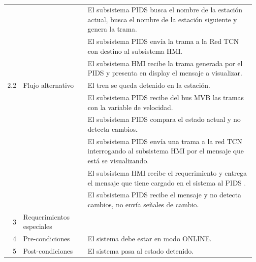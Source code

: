 \begin{table}[]
\begin{tabular}{|lll|}
\multicolumn{1}{|l|}{{ }} & \multicolumn{1}{l|}{{ }} & { El subsistema PIDS busca el nombre de la estación actual, busca el nombre de la estación siguiente y genera la trama.} \\
 
\multicolumn{1}{|l|}{{ }} & \multicolumn{1}{l|}{{ }} & { El subsistema PIDS envía la trama a la Red TCN con destino al subsistema HMI.} \\
 
\multicolumn{1}{|l|}{{ }} & \multicolumn{1}{l|}{{ }} & { El subsistema HMI recibe la trama generada por el PIDS y presenta en display el mensaje a visualizar.} \\
 
\multicolumn{1}{|r|}{{ 2.2}} & \multicolumn{1}{l|}{{ Flujo alternativo}} & { El tren se queda detenido en la estación.} \\
 
\multicolumn{1}{|l|}{{ }} & \multicolumn{1}{l|}{{ }} & { El subsistema PIDS recibe del bus MVB las tramas con la variable de velocidad.} \\
 
\multicolumn{1}{|l|}{{ }} & \multicolumn{1}{l|}{{ }} & { El subsistema PIDS compara el estado actual y no detecta cambios.} \\
 
\multicolumn{1}{|l|}{{ }} & \multicolumn{1}{l|}{{ }} & { El subsistema PIDS envía una trama a la red TCN interrogando al subsistema HMI por el mensaje que está se visualizando.} \\
 
\multicolumn{1}{|l|}{{ }} & \multicolumn{1}{l|}{{ }} & { El subsistema HMI recibe el requerimiento y entrega el mensaje que tiene cargado en el sistema al PIDS .} \\
 
\multicolumn{1}{|l|}{{ }} & \multicolumn{1}{l|}{{ }} & { El subsistema PIDS recibe el mensaje y no detecta cambios, no envía señales de cambio.} \\ \hline
 
\multicolumn{1}{|r|}{{ 3}} & \multicolumn{1}{l|}{{ Requerimientos especiales}} & { } \\ \hline
 
\multicolumn{1}{|r|}{{ 4}} & \multicolumn{1}{l|}{{ Pre-condiciones}} & { El sistema debe estar en modo ONLINE.} \\ \hline
 
\multicolumn{1}{|r|}{{ 5}} & \multicolumn{1}{l|}{{ Post-condiciones}} & { El sistema pasa al estado detenido.} \\ \hline
\end{tabular}
\caption{}
\label{tab:my-table}
\end{table}


